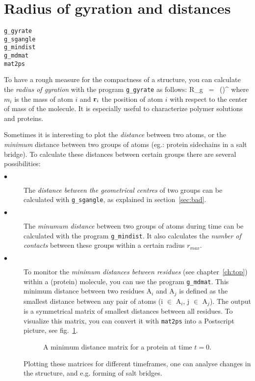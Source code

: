 \section{Radius of gyration and distances}
\label{sec:rg}
\begin{verbatim}
g_gyrate
g_sgangle
g_mindist
g_mdmat
mat2ps
\end{verbatim}
To have a rough measure for the compactness of a structure, you can calculate 
the {\em radius of gyration} with the program {\tt g\_gyrate} as follows:
\beq
R_g ~=~ \left({}\right)^{\half}
\label{eq:rg}
\eeq
where $m_i$ is the mass of atom $i$ and ${\bf r}_i$ the position of 
atom $i$ with respect to the center of mass of the molecule. It is especially 
useful to characterize polymer solutions and proteins.

Sometimes it is interesting to plot the {\em distance} between two atoms,
or the {\em minimum} distance between two groups of atoms
(eg.: protein sidechains in a salt bridge). 
To calculate these distances between certain groups there are several 
possibilities:
\begin{description}
\item[$\bullet$] 
The {\em distance between the geometrical centres} of two groups can be 
calculated with {\tt g\_sgangle}, as explained in section~\ref{sec:bad}. 
\item[$\bullet$] 
The {\em minumum distance} between two groups of atoms during time 
can be calculated with the program {\tt g\_mindist}. It also calculates the 
{\em number of contacts} between these groups 
within a certain radius $r_{max}$.
\item[$\bullet$] 
To monitor the {\em minimum distances between residues} 
(see chapter~\ref{ch:top}) within a (protein) molecule, you can use 
the program {\tt g\_mdmat}. This minimum distance between two residues
A$_i$ and A$_j$ is defined as the smallest distance between any pair of 
atoms (i $\in$ A$_i$, j $\in$ A$_j$).
The output is a symmetrical matrix of smallest distances 
between all residues. To visualize this matrix, you can convert it with 
{\tt mat2ps} into a Postscript picture, see fig.~\ref{fig:mdmat}.
%
\begin{figure}[hbtp]
\centerline{
}
\caption{A minimum distance matrix for a protein at time $t=0$.}
\label{fig:mdmat}
\end{figure}
%
Plotting these matrices for different timeframes, one can analyse changes 
in the structure, and e.g. forming of salt bridges.
\end{description}
%
%
